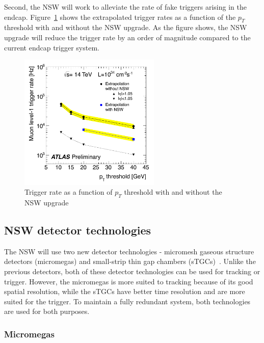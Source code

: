 Second, the NSW will work to alleviate the rate of fake triggers arising in the endcap. Figure~\ref{fig:NSW_trig} shows the extrapolated trigger rates as a function of the $p_{T}$ threshold with and without the NSW upgrade. As the figure shows, the NSW upgrade will reduce the trigger rate by an order of magnitude compared to the current endcap trigger system. 

\begin{figure}[h!]
  \centering
  \captionsetup{justification=centering}

  \includegraphics[width=0.6\textwidth]{figures/NSW_trigger_rate}
   \caption{Trigger rate as a function of $p_{T}$ threshold with and without the NSW upgrade~\cite{NSW_TDR}}
  \label{fig:NSW_trig}
\end{figure}

\subsection{NSW detector technologies}

The NSW will use two new detector technologies - micromesh gaseous structure detectors (micromegas) and small-strip thin gap chambers (sTGCs)~\cite{MMPaper,NSW_TDR}. Unlike the previous detectors, both of these detector technologies can be used for tracking or trigger. However, the micromegas is more suited to tracking because of its good spatial resolution, while the sTGCs have better time resolution and are more suited for the trigger. To maintain a fully redundant system, both technologies are used for both purposes. 

\subsubsection{Micromegas}

